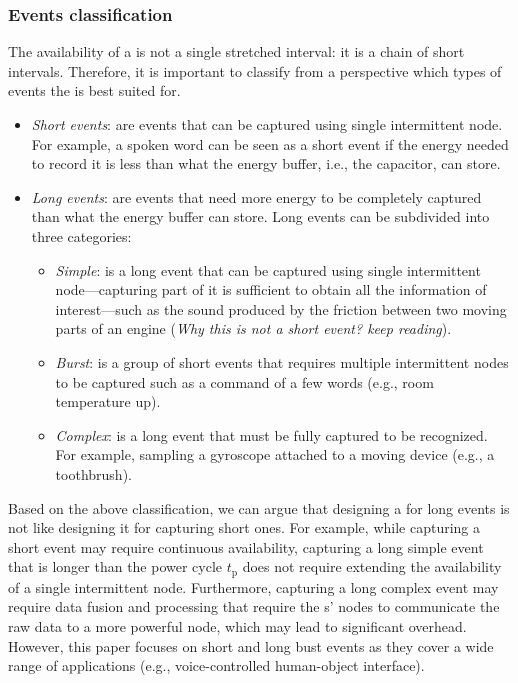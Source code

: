 \subsubsection{Events classification}
\label{sec:event_classification}
The availability of a \cis is not a single stretched interval: it is a chain of short intervals. Therefore, it is important to classify from a \cis perspective which types of events the \cis is best suited for. 
%
\begin{itemize}[leftmargin=*]
\item \textit{Short events}: are events that can be captured using single intermittent node. For example, a spoken word can be seen as a short event if the energy needed to record it is less than what the energy buffer, i.e., the capacitor, can store.
\item \textit{Long events}: are events that need more energy to be completely captured than what the energy buffer can store. Long events can be subdivided into three categories: 
	\begin{itemize}
		\item \textit{Simple}: is a long event that can be captured using single intermittent node---capturing part of it is sufficient to obtain all the information of interest---such as the sound produced by the friction between two moving parts of an engine (\textit{Why this is not a short event? keep reading}). 
		\item \textit{Burst}: is a group of short events that requires multiple intermittent nodes to be captured such as a command of a few words (e.g., room temperature up).
		\item \textit{Complex}: is a long event that must be fully captured to be recognized. For example, sampling a gyroscope attached to a moving device (e.g., a toothbrush).

	\end{itemize}
\end{itemize}

Based on the above classification, we can argue that designing a \cis for long events is not like designing it for capturing short ones. For example, while capturing a short event may require continuous \cis availability, capturing a long simple event that is longer than the power cycle $t_\text{p}$ does not require extending the availability of a single intermittent node. Furthermore, capturing a long complex event may require data fusion and processing that require the \cis{}s' nodes to communicate the raw data to a more powerful node, which may lead to significant overhead. However, this paper focuses on short and long bust events as they cover a wide range of applications (e.g., voice-controlled human-object interface). 

